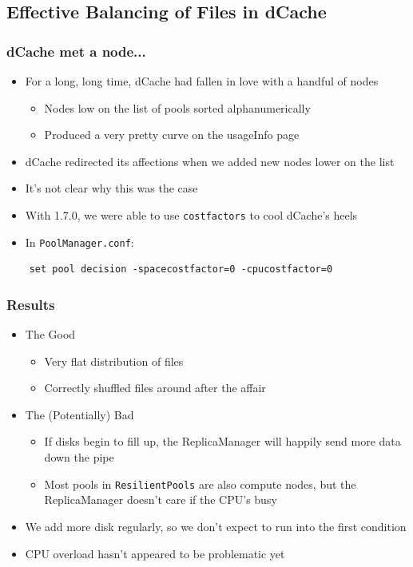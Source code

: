 \documentclass{beamer}
\begin{document}
\subsection[dCache Load Balancing]{Effective Balancing of Files in dCache}
\begin{frame}[fragile]
\frametitle{dCache met a node...}
\begin{itemize}
    \item For a long, long time, dCache had fallen in love with a handful of nodes
    \begin{itemize}
        \item Nodes low on the list of pools sorted alphanumerically
        \item Produced a very pretty curve on the usageInfo page
    \end{itemize}
    \item dCache redirected its affections when we added new nodes lower on the list
    \item It's not clear why this was the case
    \item With 1.7.0, we were able to use {\tt costfactors} to cool dCache's 
    heels
    \item In {\tt PoolManager.conf}:
\end{itemize}
\begin{verbatim}
    set pool decision -spacecostfactor=0 -cpucostfactor=0
\end{verbatim}
\end{frame}

\begin{frame}
\frametitle{Results}
\begin{itemize}
    \item The Good
    \begin{itemize}
        \item Very flat distribution of files
        \item Correctly shuffled files around after the affair
    \end{itemize}
    \item The (Potentially) Bad
    \begin{itemize}
        \item If disks begin to fill up, the ReplicaManager will happily send more data down the pipe
        \item Most pools in {\tt ResilientPools} are also compute nodes, but the ReplicaManager doesn't care if the CPU's busy
    \end{itemize}
    \item We add more disk regularly, so we don't expect to run into the first condition
    \item CPU overload hasn't appeared to be problematic yet
\end{itemize}
\end{frame}
\end{document}
